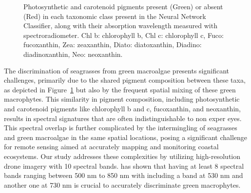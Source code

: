 \documentclass[
  number]{elsarticle}
\begin{document}
\label{cell-fig-Pigm}
\begin{figure}[H]


\caption{\label{fig-Pigm}Photosynthetic and carotenoid pigments present
(Green) or absent (Red) in each taxonomic class present in the Neural
Network Classifier, along with their absorption wavelength measured with
spectroradiometer. Chl b: chlorophyll b, Chl c: chlorophyll c, Fuco:
fucoxanthin, Zea: zeaxanthin, Diato: diatoxanthin, Diadino:
diadinoxanthin, Neo: neoxanthin.}

\end{figure}%

The discrimination of seagrasses from green macroalgae presents
significant challenges, primarily due to the shared pigment composition
between these taxa, as depicted in Figure~\ref{fig-Pigm} but also by the
frequent spatial mixing of these green macrophytes. This similarity in
pigment composition, including photosynthetic and carotenoid pigments
like chlorophyll b and c, fucoxanthin, and neoxanthin, results in
spectral signatures that are often indistinguishable to non exper eyes.
This spectral overlap is further complicated by the intermingling of
seagrasses and green macroalgae in the same spatial locations, posing a
significant challenge for remote sensing aimed at accurately mapping and
monitoring coastal ecosystems. Our study addresses these complexities by
utilizing high-resolution drone imagery with 10 spectral bands.
\citep{Davies2023} has shown that having at least 8 spectral bands
ranging between 500 nm to 850 nm with including a band at 530 nm and
another one at 730 nm is crucial to accurately discriminate green
macrophytes.
\end{document}
